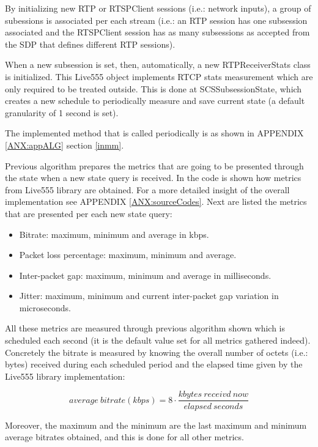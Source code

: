 By initializing new RTP or RTSPClient sessions (i.e.: network inputs), a group of subessions is associated per each stream (i.e.: an RTP session has one subsession associated and the RTSPClient session has as many subsessions as accepted from the SDP that defines different RTP sessions).

When a new subsession is set, then, automatically, a new RTPReceiverStats class is initialized. This Live555 object implements RTCP stats measurement which are only required to be treated outside. This is done at SCSSubsessionState, which creates a new schedule to periodically measure and save current state (a default granularity of 1 second is set).

The implemented method that is called periodically is as shown in APPENDIX \ref{ANX:appALG} section \ref{inmm}.

Previous algorithm prepares the metrics that are going to be presented through the state when a new state query is received. In the code is shown how metrics from Live555 library are obtained. For a more detailed insight of the overall implementation see APPENDIX \ref{ANX:sourceCodes}. Next are listed the metrics that are presented per each new state query:

\begin{itemize}
\item Bitrate: maximum, minimum and average in kbps.
\item Packet loss percentage: maximum, minimum and average.
\item Inter-packet gap: maximum, minimum and average in milliseconds.
\item Jitter: maximum, minimum and current inter-packet gap variation in microseconds.
\end{itemize}

All these metrics are measured through previous algorithm shown which is scheduled each second (it is the default value set for all metrics gathered indeed). Concretely the bitrate is measured by knowing the overall number of octets (i.e.: bytes) received during each scheduled period and the elapsed time given by the Live555 library implementation:

\begin{equation}\label{E:bitrate}
average\ bitrate (kbps) = 8 \cdot \frac{kbytes\ receivd\ now}{elapsed\ seconds}
\end{equation}

Moreover, the maximum and the minimum are the last maximum and minimum average bitrates obtained, and this is done for all other metrics.

